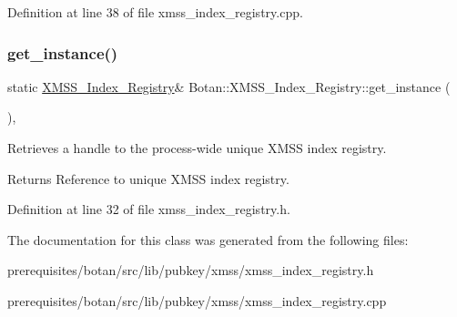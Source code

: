 Definition at line 38 of file xmss\+\_\+index\+\_\+registry.\+cpp.

\mbox{\label{class_botan_1_1_x_m_s_s___index___registry_a1f1342ed0b520a67ae8165d3cf0e989e}} 
\subsubsection{\texorpdfstring{get\+\_\+instance()}{get\_instance()}}
{\footnotesize\ttfamily static \mbox{\hyperlink{class_botan_1_1_x_m_s_s___index___registry}{X\+M\+S\+S\+\_\+\+Index\+\_\+\+Registry}}\& Botan\+::\+X\+M\+S\+S\+\_\+\+Index\+\_\+\+Registry\+::get\+\_\+instance (\begin{DoxyParamCaption}{ }\end{DoxyParamCaption})\hspace{0.3cm}{\ttfamily [inline]}, {\ttfamily [static]}}

Retrieves a handle to the process-\/wide unique X\+M\+SS index registry.

\begin{DoxyReturn}{Returns}
Reference to unique X\+M\+SS index registry. 
\end{DoxyReturn}


Definition at line 32 of file xmss\+\_\+index\+\_\+registry.\+h.



The documentation for this class was generated from the following files\+:\begin{DoxyCompactItemize}
\item 
prerequisites/botan/src/lib/pubkey/xmss/xmss\+\_\+index\+\_\+registry.\+h\item 
prerequisites/botan/src/lib/pubkey/xmss/xmss\+\_\+index\+\_\+registry.\+cpp\end{DoxyCompactItemize}
